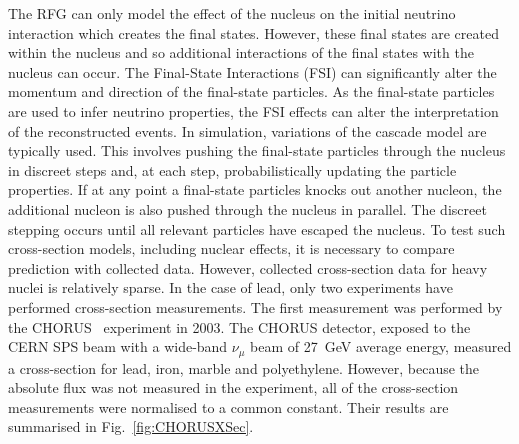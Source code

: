 \newline
\newline
The RFG can only model the effect of the nucleus on the initial neutrino interaction which creates the final states.  However, these final states are created within the nucleus and so additional interactions of the final states with the nucleus can occur.  The Final-State Interactions (FSI) can significantly alter the momentum and direction of the final-state particles.  As the final-state particles are used to infer neutrino properties, the FSI effects can alter the interpretation of the reconstructed events.  In simulation, variations of the cascade model are typically used.  This involves pushing the final-state particles through the nucleus in discreet steps and, at each step, probabilistically updating the particle properties.  If at any point a final-state particles knocks out another nucleon, the additional nucleon is also pushed through the nucleus in parallel.  The discreet stepping occurs until all relevant particles have escaped the nucleus.
\newline
\newline
To test such cross-section models, including nuclear effects, it is necessary to compare prediction with collected data.  However, collected cross-section data for heavy nuclei is relatively sparse.  In the case of lead, only two experiments have performed cross-section measurements.  The first measurement was performed by the CHORUS~\cite{CHORUS_XSEC} experiment in 2003.  The CHORUS detector, exposed to the CERN SPS beam with a wide-band $\nu_\mu$ beam of 27~GeV average energy, measured a cross-section for lead, iron, marble and polyethylene.  However, because the absolute flux was not measured in the experiment, all of the cross-section measurements were normalised to a common constant.  Their results are summarised in Fig.~\ref{fig:CHORUSXSec}.
